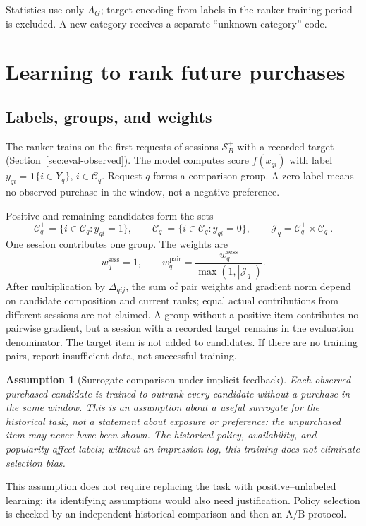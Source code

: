 \documentclass[12pt,a4paper]{article}
\newcommand{\ind}{\mathbf 1}
\theoremstyle{plainru}
\newtheorem{assumption}{Assumption}[section]
\begin{document}
Statistics use only $A_G$; target encoding from labels
in the ranker-training period is excluded. A new category receives
a separate ``unknown category'' code.

\section{Learning to rank future purchases}\label{sec:model-ranking}

\subsection{Labels, groups, and weights}

The ranker trains on the first requests of sessions $\mathcal S_B^+$
with a recorded target (Section~\ref{sec:eval-observed}).
The model computes score $f(x_{qi})$ with label
$y_{qi}=\ind\{i\in Y_q\}$, $i\in\mathcal C_q$.
Request $q$ forms a comparison group. A zero label means
no observed purchase in the window, not a negative preference.

Positive and remaining candidates form the sets
\begin{equation}\label{eq:model-pair-sets}
\mathcal C_q^+=\{i\in\mathcal C_q:y_{qi}=1\},\qquad
\mathcal C_q^-=\{i\in\mathcal C_q:y_{qi}=0\},\qquad
\mathcal J_q=\mathcal C_q^+\times\mathcal C_q^-.
\end{equation}
One session contributes one group. The weights are
\begin{equation}\label{eq:model-ranking-weights}
w_q^{\mathrm{sess}}=1,\qquad
w_q^{\mathrm{pair}}=\frac{w_q^{\mathrm{sess}}}{\max(1,|\mathcal J_q|)}.
\end{equation}
After multiplication by $\Delta_{qij}$, the sum of pair weights
and gradient norm depend on candidate composition and current ranks;
equal actual contributions from different sessions are not claimed.
A group without a positive item contributes no pairwise gradient,
but a session with a recorded target remains in the evaluation denominator.
The target item is not added to candidates. If there are no training pairs,
report insufficient data, not successful training.

\begin{assumption}[Surrogate comparison under implicit feedback]
\label{ass:model-implicit-negatives}
Each observed purchased candidate is trained to outrank
every candidate without a purchase in the same window. This is an assumption about a useful
surrogate for the historical task, not a statement about exposure
or preference: the unpurchased item may never have been shown.
The historical policy, availability, and popularity affect labels;
without an impression log, this training does not eliminate selection bias.
\end{assumption}
This assumption does not require replacing the task
with positive--unlabeled learning: its identifying assumptions
would also need justification. Policy selection is checked
by an independent historical comparison and then an A/B protocol.
\end{document}
